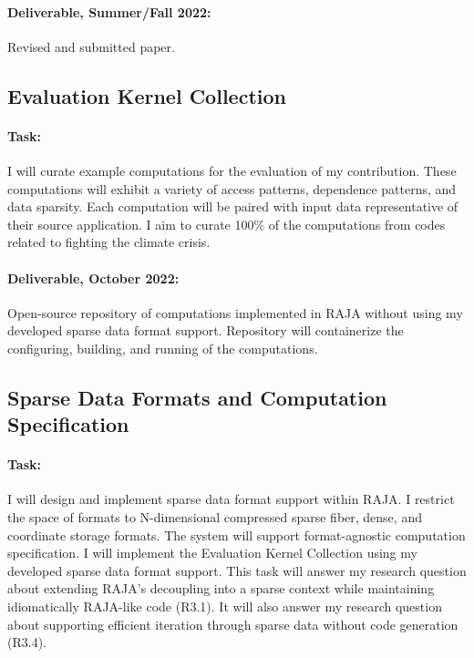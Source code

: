 \documentclass{article}
\begin{document}
\paragraph{Deliverable, Summer/Fall 2022:} Revised and submitted paper.


\subsection{Evaluation Kernel Collection}

\paragraph{Task:} I will curate example computations for the evaluation of my contribution.
These computations will exhibit a variety of access patterns, dependence patterns, and data sparsity.
Each computation will be paired with input data representative of their source application. 
I aim to curate 100\% of the computations from codes related to fighting the climate crisis.

\paragraph{Deliverable, October 2022:} Open-source repository of computations implemented in RAJA without using my developed sparse data format support.
Repository will containerize the configuring, building, and running of the computations. 

\subsection{Sparse Data Formats and Computation Specification}
\paragraph{Task:} 
I will design and implement sparse data format support within RAJA. 
I restrict the space of formats to N-dimensional compressed sparse fiber, dense, and coordinate storage formats.
The system will support format-agnostic computation specification.
I will implement the Evaluation Kernel Collection using my developed sparse data format support.
This task will answer my research question about extending RAJA's decoupling into a sparse context while maintaining idiomatically RAJA-like code (R3.1).
It will also answer my research question about supporting efficient iteration through sparse data without code generation (R3.4). 
\end{document}

